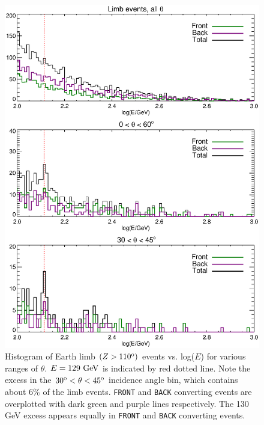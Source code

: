 \documentclass[aps,twocolumn,prd,superscriptaddress,showpacs,nofootinbib,fixfloat]{revtex4}
\newcommand{\GeV}{{\rm ~GeV}}
\newcommand{\degree}{^{\rm o}}
\begin{document}
\begin{figure}
  \centering
  \includegraphics[width=1.0\linewidth]{plots/Ehist-all.ps}
  \caption{Histogram of Earth limb $(Z>110\degree)$ events vs.
    log($E$) for various ranges of $\theta$. 
    $E=129\GeV$ is
    indicated by red dotted line.  Note the excess in the
    $30\degree < \theta < 45\degree$ incidence angle bin,
    which contains about 6\% of the limb
    events. \texttt{FRONT} and \texttt{BACK} converting
    events are overplotted with dark green and purple lines
    respectively. The 130 GeV excess appears equally in
    \texttt{FRONT} and \texttt{BACK} converting events.}
  \label{fig:Ehist-all}
\end{figure}
\end{document}
